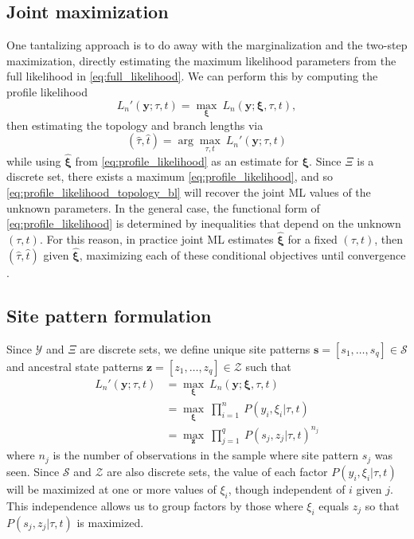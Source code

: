 \documentclass[a4paper]{article}
\begin{document}
\subsection{Joint maximization}

One tantalizing approach is to do away with the marginalization and the two-step maximization, directly estimating the maximum likelihood parameters from the full likelihood in \eqref{eq:full_likelihood}.
We can perform this by computing the profile likelihood
\begin{equation}
\label{eq:profile_likelihood}
L_n'(\mathbf{y};\tau, t) = \max_{\boldsymbol\xi} \ L_n(\mathbf{y};\boldsymbol\xi, \tau, t),
\end{equation}
then estimating the topology and branch lengths via
\begin{equation}
\label{eq:profile_likelihood_topology_bl}
(\hat{\tau}, \hat{t}) = \arg\max_{\tau, t} \ L_n'(\mathbf{y};\tau, t)
\end{equation}
while using $\hat{\boldsymbol\xi}$ from \eqref{eq:profile_likelihood} as an estimate for $\boldsymbol\xi$.
Since $\Xi$ is a discrete set, there exists a maximum \eqref{eq:profile_likelihood}, and so \eqref{eq:profile_likelihood_topology_bl} will recover the joint ML values of the unknown parameters.
In the general case, the functional form of \eqref{eq:profile_likelihood} is determined by inequalities that depend on the unknown $(\tau,t)$.
For this reason, in practice joint ML estimates $\hat{\boldsymbol\xi}$ for a fixed $(\tau,t)$, then $(\hat{\tau},\hat{t})$ given $\hat{\boldsymbol\xi}$, maximizing each of these conditional objectives until convergence \cite{Neher2017}.

\subsection{Site pattern formulation}

Since $\mathcal{Y}$ and $\Xi$ are discrete sets, we define unique site patterns $\mathbf{s}=[s_1,\ldots,s_q]\in\mathcal{S}$ and ancestral state patterns $\mathbf{z}=[z_1,\ldots,z_q]\in\mathcal{Z}$ such that
\begin{align}
L_n'(\mathbf{y};\tau, t) &= \max_{\boldsymbol\xi} \ L_n(\mathbf{y};\boldsymbol\xi, \tau, t) \\
    &= \max_{\boldsymbol\xi} \ \prod_{i=1}^{n} \ P(y_i, \xi_i | \tau, t) \\
    &= \max_{\mathbf{z}} \ \prod_{j=1}^{q} \ P(s_j, z_j | \tau, t)^{n_j} \label{eq:site_pattern_likelihood}
\end{align}
where $n_j$ is the number of observations in the sample where site pattern $s_j$ was seen.
Since $\mathcal{S}$ and $\mathcal{Z}$ are also discrete sets, the value of each factor $P(y_i, \xi_i | \tau, t)$ will be maximized at one or more values of $\xi_i$, though independent of $i$ given $j$.
This independence allows us to group factors by those where $\xi_i$ equals $z_j$ so that $P(s_j, z_j | \tau, t)$ is maximized.
\end{document}
